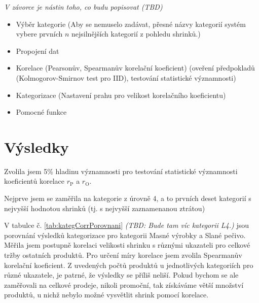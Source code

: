 \emph{V závorce je nástin toho, co budu popisovat (TBD)}

\begin{itemize}
    \item Výběr kategorie (Aby se nemuselo zadávat, přesné názvy kategorií systém vybere prvních $n$ nejsilnějších kategorií z pohledu shrinků.)
    \item Propojení dat
    \item Korelace (Pearsonův, Spearmanův korelační koeficient) (oveření předpokladů (Kolmogorov-Smirnov test pro IID), testování statistické významnosti)
    \item Kategorizace (Nastavení prahu pro velikost korelačního koeficientu)
    \item Pomocné funkce
\end{itemize}

\section{Výsledky}
Zvolila jsem 5\% hladinu významnosti pro testování statistické významnosti koeficientů korelace $r_\mathrm{P}$ a $r_\mathrm{O}$.

Nejprve jsem se zaměřila na kategorie z úrovně 4, a to prvních deset kategorií s nejvyšší hodnotou shrinků (tj. s nejvyšší zaznamenanou ztrátou) 

V tabulce č. \ref*{tab:kategCorrPorovnani} \emph{(TBD: Bude tam víc kategorii L4.)} jsou porovnání výsledků kategorizace pro kategorii Masné výrobky a Slané pečivo. Měřila jsem postupně korelaci velikosti shrinku s různými ukazateli pro celkové tržby ostatních produktů. Pro určení míry korelace jsem zvolila Spearmanův korelační koeficient. Z uvedených počtů produktů u jednotlivých kategoriích pro různé ukazatele, je patrné, že výsledky se příliš neliší. Pokud bychom se ale zaměřovali na celkové prodeje, nikoli promoční, tak získáváme větší množství produktů, u nichž nebylo možné vysvětlit shrink pomocí korelace. 

